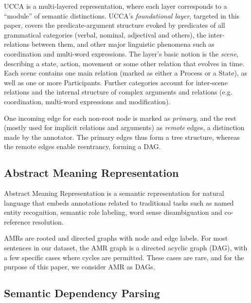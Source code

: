 \documentclass[11pt,a4paper]{article}
\begin{document}
UCCA is a multi-layered representation, where each layer corresponds
to a ``module'' of semantic distinctions.
UCCA's \textit{foundational layer}, targeted in this paper, covers the predicate-argument
structure evoked by predicates of all grammatical categories
(verbal, nominal, adjectival and others), the inter-relations between them,
and other major linguistic phenomena such as coordination and multi-word expressions.
The layer's basic notion is the \textit{scene},
describing a state, action, movement or some other relation that evolves in time.
Each scene contains one main relation (marked as either a Process or a State),
as well as one or more Participants.
Further categories account for inter-scene relations and the internal structure of
complex arguments and relations (e.g. coordination, multi-word expressions and modification).

One incoming edge for each non-root node is marked as \textit{primary},
and the rest (mostly used for implicit relations and arguments) as \textit{remote} edges,
a distinction made by the annotator.
The primary edges thus form a tree structure, whereas the remote edges enable reentrancy,
forming a DAG.

\subsection{Abstract Meaning Representation}\label{sec:amr}

Abstract Meaning Representation \cite[AMR; ][]{banarescu2013abstract}
is a semantic representation for natural
language that embeds annotations related
to traditional tasks such as named entity
recognition, semantic role labeling, word
sense disambiguation and co-reference
resolution.

AMRs are rooted and directed
graphs with node and edge labels.
For most sentences in our dataset, the
AMR graph is a directed acyclic graph (DAG),
with a few specific cases where cycles are permitted.
These cases are rare, and for the purpose of
this paper, we consider AMR as DAGs.

\subsection{Semantic Dependency Parsing}\label{sec:sdp}
\end{document}
